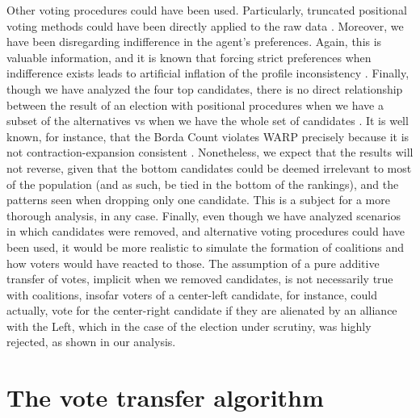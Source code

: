 \documentclass[hidelinks,11pt]{article}
\begin{document}
Other voting procedures could have been used. Particularly, truncated positional
voting methods could have been directly applied to the raw data
\parencite{terzopoulou2021borda}. Moreover, we have been disregarding
indifference in the agent's preferences. Again, this is valuable information,
and it is known that forcing strict preferences when indifference exists leads
to artificial inflation of the profile inconsistency
\parencite{gehrlein2010impact}. Finally, though we have analyzed the four top
candidates, there is no direct relationship between the result of an election
with positional procedures when we have a subset of the alternatives vs when we
have the whole set of candidates \parencite{saari2001chaotic}. It is well known,
for instance, that the Borda Count violates WARP precisely because it is not
contraction-expansion consistent \parencite{schwartz2018cycles}. Nonetheless, we
expect that the results will not reverse, given that the bottom candidates could
be deemed irrelevant to most of the population (and as such, be tied in the
bottom of the rankings), and the patterns seen when dropping only one candidate.
This is a subject for a more thorough analysis, in any case. Finally, even
though we have analyzed scenarios in which candidates were removed, and
alternative voting procedures could have been used, it would be more realistic
to simulate the formation of coalitions and how voters would have reacted to
those. The assumption of a pure additive transfer of votes, implicit when we
removed candidates, is not necessarily true with coalitions, insofar voters of a
center-left candidate, for instance, could actually, vote for the center-right
candidate if they are alienated by an alliance with the Left, which in the case
of the election under scrutiny, was highly rejected, as shown in our analysis.


\printbibliography
\pagebreak
\appendix
\section{The vote transfer algorithm}\label{appendix:transfer}
\end{document}
